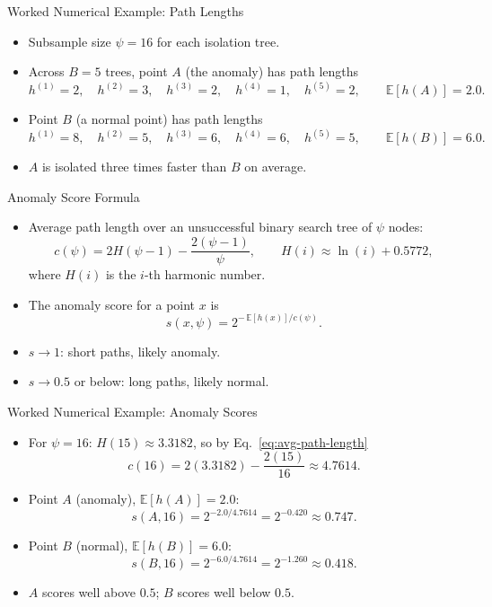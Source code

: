 \begin{frame}{Worked Numerical Example: Path Lengths}
\small
\begin{itemize}
  \item Subsample size $\psi=16$ for each isolation tree.
  \item Across $B=5$ trees, point $A$ (the anomaly) has path lengths
  \[
    h^{(1)}=2,\quad h^{(2)}=3,\quad h^{(3)}=2,\quad h^{(4)}=1,\quad h^{(5)}=2,
    \qquad \mathbb{E}[h(A)] = 2.0.
  \]
  \pause
  \item Point $B$ (a normal point) has path lengths
  \[
    h^{(1)}=8,\quad h^{(2)}=5,\quad h^{(3)}=6,\quad h^{(4)}=6,\quad h^{(5)}=5,
    \qquad \mathbb{E}[h(B)] = 6.0.
  \]
  \pause
  \item $A$ is isolated three times faster than $B$ on average.
\end{itemize}
\end{frame}

\begin{frame}{Anomaly Score Formula}
\begin{itemize}
  \item Average path length over an unsuccessful binary search tree of $\psi$ nodes:
  \begin{equation}
    c(\psi) = 2H(\psi-1) - \frac{2(\psi-1)}{\psi},
    \qquad H(i) \approx \ln(i) + 0.5772,
    \label{eq:avg-path-length}
  \end{equation}
  where $H(i)$ is the $i$-th harmonic number.
  \pause
  \item The anomaly score for a point $x$ is
  \begin{equation}
    s(x,\psi) = 2^{-\,\mathbb{E}[h(x)]/c(\psi)}.
    \label{eq:anomaly-score}
  \end{equation}
  \pause
  \item $s \to 1$: short paths, likely anomaly.
  \item $s \to 0.5$ or below: long paths, likely normal.
\end{itemize}
\end{frame}

\begin{frame}{Worked Numerical Example: Anomaly Scores}
\small
\begin{itemize}
  \item For $\psi=16$: $H(15) \approx 3.3182$, so by Eq.~\eqref{eq:avg-path-length}
  \[
    c(16) = 2(3.3182) - \frac{2(15)}{16} \approx 4.7614.
  \]
  \pause
  \item Point $A$ (anomaly), $\mathbb{E}[h(A)] = 2.0$:
  \[
    s(A,16) = 2^{-2.0/4.7614} = 2^{-0.420} \approx 0.747.
  \]
  \pause
  \item Point $B$ (normal), $\mathbb{E}[h(B)] = 6.0$:
  \[
    s(B,16) = 2^{-6.0/4.7614} = 2^{-1.260} \approx 0.418.
  \]
  \pause
  \item $A$ scores well above $0.5$; $B$ scores well below $0.5$.
\end{itemize}
\end{frame}


